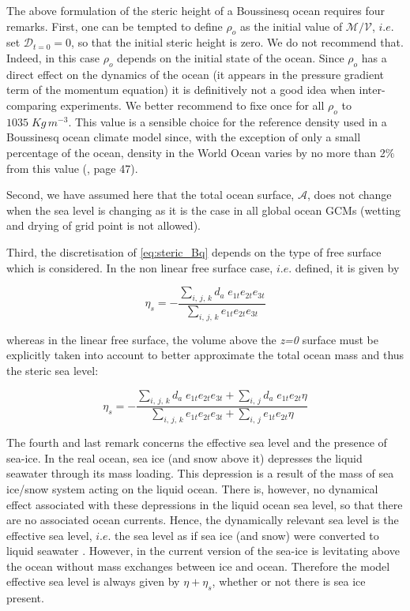 \documentclass[../tex_main/NEMO_manual]{subfiles}
\begin{document}
The above formulation of the steric height of a Boussinesq ocean requires four remarks.
First, one can be tempted to define $\rho_o$ as the initial value of $\mathcal{M}/\mathcal{V}$,
$i.e.$ set $\mathcal{D}_{t=0}=0$, so that the initial steric height is zero.
We do not recommend that.
Indeed, in this case $\rho_o$ depends on the initial state of the ocean.
Since $\rho_o$ has a direct effect on the dynamics of the ocean (it appears in 
the pressure gradient term of the momentum equation) it is definitively not a good idea when 
inter-comparing experiments.
We better recommend to fixe once for all $\rho_o$ to $1035\;Kg\,m^{-3}$.
This value is a sensible choice for the reference density used in a Boussinesq ocean climate model since, 
with the exception of only a small percentage of the ocean, density in the World Ocean varies by 
no more than 2$\%$ from this value (\cite{Gill1982}, page 47).

Second, we have assumed here that the total ocean surface, $\mathcal{A}$, does not change when 
the sea level is changing as it is the case in all global ocean GCMs 
(wetting and drying of grid point is not allowed).
  
Third, the discretisation of \autoref{eq:steric_Bq} depends on the type of 
free surface which is considered.
In the non linear free surface case, $i.e.$  defined, it is given by

\[ \eta_s = - \frac{ \sum_{i,\,j,\,k} d_a\; e_{1t} e_{2t} e_{3t} }
                   { \sum_{i,\,j,\,k}       e_{1t} e_{2t} e_{3t} }
 \label{eq:discrete_steric_Bq_nfs} \]

whereas in the linear free surface, the volume above the \textit{z=0} surface must be explicitly 
taken into account to better approximate the total ocean mass and thus the steric sea level:

\[	\eta_s = - \frac{ \sum_{i,\,j,\,k} d_a\; e_{1t}e_{2t}e_{3t} + \sum_{i,\,j} d_a\; e_{1t}e_{2t} \eta }
                   { \sum_{i,\,j,\,k}       e_{1t}e_{2t}e_{3t} + \sum_{i,\,j}      e_{1t}e_{2t} \eta }
 \label{eq:discrete_steric_Bq_fs} \]

The fourth and last remark concerns the effective sea level and the presence of sea-ice.
In the real ocean, sea ice (and snow above it)  depresses the liquid seawater through its mass loading.
This depression is a result of the mass of sea ice/snow system acting on the liquid ocean.
There is, however, no dynamical effect associated with these depressions in the liquid ocean sea level, 
so that there are no associated ocean currents.
Hence, the dynamically relevant sea level is the effective sea level, $i.e.$ the sea level as if 
sea ice (and snow) were converted to liquid seawater \citep{Campin_al_OM08}.
However, in the current version of \NEMO the sea-ice is levitating above the ocean without 
mass exchanges between ice and ocean.
Therefore the model effective sea level is always given by $\eta + \eta_s$, 
whether or not there is sea ice present.
\end{document}
